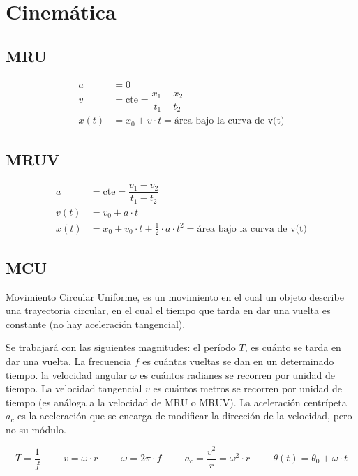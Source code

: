 \section{Cinemática}

\subsection{MRU}

\vspace{-\baselineskip}
\begin{align*}
a &= 0\\
v &= \text{cte} = \dfrac{x_1 - x_2}{t_1 - t_2}\\
x(t) &= x_0 + v \cdot t = \text{área bajo la curva de v(t)}
\end{align*}


\subsection{MRUV}

\vspace{-\baselineskip}
\begin{align*}
a &= \text{cte} = \dfrac{v_1 - v_2}{t_1 - t_2}\\
v(t) &= v_0 + a\cdot t\\
x(t) &= x_0 + v_0\cdot t + \frac{1}{2}\cdot a \cdot t^2 = \text{área bajo la curva de v(t)}    
\end{align*}


\subsection{MCU}

Movimiento Circular Uniforme, es un movimiento en el cual un objeto describe una trayectoria circular, en el cual el tiempo que tarda en dar una vuelta es constante (no hay aceleración tangencial).

Se trabajará con las siguientes magnitudes: el período $T$, es cuánto se tarda en dar una vuelta. La frecuencia $f$ es cuántas vueltas se dan en un determinado tiempo. la velocidad angular $\omega$ es cuántos radianes se recorren por unidad de tiempo. La velocidad tangencial $v$ es cuántos metros se recorren por unidad de tiempo (es análoga a la velocidad de MRU o MRUV). La aceleración centrípeta $a_c$ es la aceleración que se encarga de modificar la dirección de la velocidad, pero no su módulo.

$$ T = \dfrac{1}{f}
\hspace{1cm}
v = \omega\cdot r
\hspace{1cm}
\omega = 2\pi \cdot f
\hspace{1cm}
a_c = \dfrac{v^2}{r}=\omega^2\cdot r
\hspace{1cm}
\theta (t) = \theta _0 + \omega \cdot t
$$


